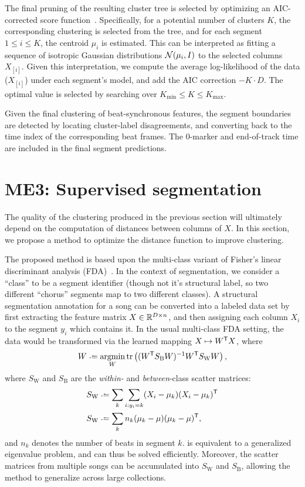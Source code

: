 \documentclass{article}
\begin{document}
The final pruning of the resulting cluster tree is selected by optimizing an AIC-corrected score 
function~\cite{akaike1973information}.  Specifically, for a potential number of clusters $K$, the corresponding
clustering is selected from the tree, and for each segment $1 \leq i \leq K$, the centroid $\mu_i$ is estimated.  
This can be interpreted as fitting a sequence of isotropic Gaussian distributions $\mathcal{N}(\mu_i, I)$ to the selected 
columns $X_{[i]}$. Given this interpretation, we compute the average log-likelihood of the data ($X_{[i]}$) under 
each segment's model, and add the AIC correction $-K\cdot D$.  The optimal value is selected by searching over
$K_{\min} \leq K \leq K_{\max}$.

Given the final clustering of beat-synchronous features, the segment boundaries are detected by locating
cluster-label disagreements, and converting back to the time index of the corresponding beat frames.  The
0-marker and end-of-track time are included in the final segment predictions.

\section{ME3: Supervised segmentation}
\label{sec:supervised}

The quality of the clustering produced in the previous section will ultimately depend on the computation of
distances between columns of $X$.  In this section, we propose a method to optimize the distance function to
improve clustering.

The proposed method is based upon the multi-class variant of Fisher's linear discriminant
analysis (FDA)~\cite{fisher1936use, fukunaga1990introduction}.  In the context of segmentation, we consider a 
``class'' to be a segment identifier (though not it's structural label, so two different ``chorus'' segments map to
two different classes).
A structural segmentation annotation for a song can be converted into a labeled data set by first extracting the 
feature matrix $X \in \mathbb{R}^{D\times n}$, and then assigning each column $X_i$ to the segment $y_i$ which contains 
it.  In the usual multi-class FDA setting, the data would be transformed via the learned mapping $X \mapsto
W^\mathsf{T} X$,
where
\begin{equation}
W \defeq \argmin_W \trace\left( (W\trans S_\text{B} W)^{-1} W\trans S_\text{W} W \right) \label{eq:fda},
\end{equation}
where $S_\text{W}$ and $S_\text{B}$ are the \emph{within-} and \emph{between}-class scatter matrices:
\begin{align*}
S_\text{W} & \defeq \sum_k \sum_{i : y_i = k} (X_i - \mu_k)(X_i - \mu_k)\trans\\
S_\text{W} & \defeq \sum_k n_k (\mu_k - \mu)(\mu_k - \mu)\trans,
\end{align*}
and $n_k$ denotes the number of beats in segment $k$.
 is equivalent to a generalized eigenvalue problem, and can thus be solved efficiently.  Moreover,
the scatter matrices from multiple songs can be accumulated into $S_\text{W}$ and $S_\text{B}$, allowing the
method to generalize across large collections.
\end{document}
